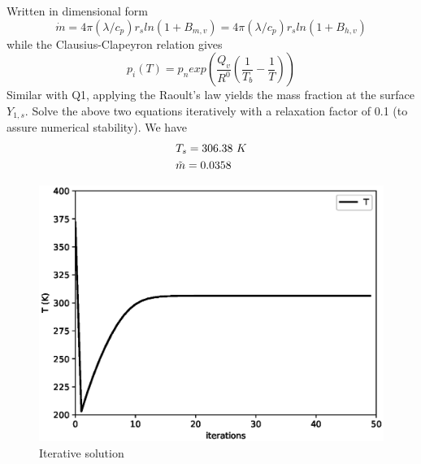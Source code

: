 \documentclass{article}
\begin{document}
Written in dimensional form
\begin{equation}
    \dot{m} = 4\pi (\lambda /c_p)r_s ln(1+B_{m,v}) = 4\pi (\lambda /c_p)r_s ln(1+B_{h,v})
\end{equation}
while the Clausius-Clapeyron relation gives
\begin{equation}
    p_i(T)=p_n exp(\frac{Q_v}{R^0}(\frac{1}{T_b} - \frac{1}{T}))
\end{equation}
Similar with Q1, applying the Raoult's law yields the mass fraction at the surface $Y_{1,s}$. Solve the above two equations iteratively with a relaxation factor of 0.1 (to assure numerical stability). We have
\begin{equation}
\begin{aligned}
    & T_s = 306.38\ K\\
    & \Tilde{m} = 0.0358
\end{aligned}
\end{equation}
\begin{figure}[htpb]
\centering
\includegraphics[scale=0.7]{DropletTIter.eps}
\caption{Iterative solution}
\label{fig:dropletTIter.eps}
\end{figure}
\end{document}

